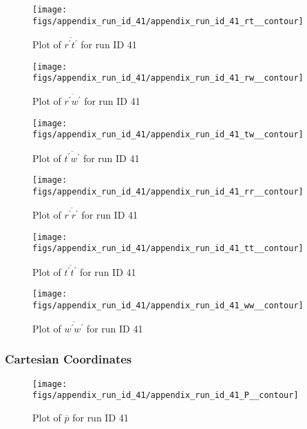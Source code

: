 \begin{figure}[H]
\centering
\texttt{[image: figs/appendix\_run\_id\_41/appendix\_run\_id\_41\_rt\_\_contour]}
\caption{Plot of $\overline{r^\prime t^\prime}$ for run ID 41}
\label{fig:appendix_run_id_41_rt__contour}
\end{figure}


\begin{figure}[H]
\centering
\texttt{[image: figs/appendix\_run\_id\_41/appendix\_run\_id\_41\_rw\_\_contour]}
\caption{Plot of $\overline{r^\prime w^\prime}$ for run ID 41}
\label{fig:appendix_run_id_41_rw__contour}
\end{figure}


\begin{figure}[H]
\centering
\texttt{[image: figs/appendix\_run\_id\_41/appendix\_run\_id\_41\_tw\_\_contour]}
\caption{Plot of $\overline{t^\prime w^\prime}$ for run ID 41}
\label{fig:appendix_run_id_41_tw__contour}
\end{figure}


\begin{figure}[H]
\centering
\texttt{[image: figs/appendix\_run\_id\_41/appendix\_run\_id\_41\_rr\_\_contour]}
\caption{Plot of $\overline{r^\prime r^\prime}$ for run ID 41}
\label{fig:appendix_run_id_41_rr__contour}
\end{figure}


\begin{figure}[H]
\centering
\texttt{[image: figs/appendix\_run\_id\_41/appendix\_run\_id\_41\_tt\_\_contour]}
\caption{Plot of $\overline{t^\prime t^\prime}$ for run ID 41}
\label{fig:appendix_run_id_41_tt__contour}
\end{figure}


\begin{figure}[H]
\centering
\texttt{[image: figs/appendix\_run\_id\_41/appendix\_run\_id\_41\_ww\_\_contour]}
\caption{Plot of $\overline{w^\prime w^\prime}$ for run ID 41}
\label{fig:appendix_run_id_41_ww__contour}
\end{figure}


\subsubsection{Cartesian Coordinates}
\begin{figure}[H]
\centering
\texttt{[image: figs/appendix\_run\_id\_41/appendix\_run\_id\_41\_P\_\_contour]}
\caption{Plot of $\overline{p}$ for run ID 41}
\label{fig:appendix_run_id_41_P__contour}
\end{figure}


